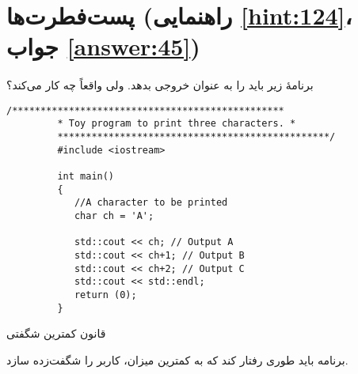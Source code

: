 \section[پست‌فطرت‌ها]{پست‌فطرت‌ها \protect{} (راهنمایی \ref{hint:124}، جواب \ref{answer:45})}
\paragraph{}\label{prog:33}
برنامهٔ زیر باید  را به عنوان خروجی بدهد. ولی واقعاً چه کار می‌کند؟

\begin{LTR}
    \begin{lstlisting}[style=C++Style]
         /************************************************
         * Toy program to print three characters. *
         ************************************************/
         #include <iostream>

         int main()
         {
         	//A character to be printed
         	char ch = 'A';

         	std::cout << ch; // Output A
         	std::cout << ch+1; // Output B
         	std::cout << ch+2; // Output C
         	std::cout << std::endl;
         	return (0);
         }
    \end{lstlisting}
\end{LTR}

\begin{tcolorbox}
    \centering
    قانون کمترین شگفتی

    برنامه باید طوری رفتار کند که به کمترین میزان، کاربر را شگفت‌زده سازد.
\end{tcolorbox}